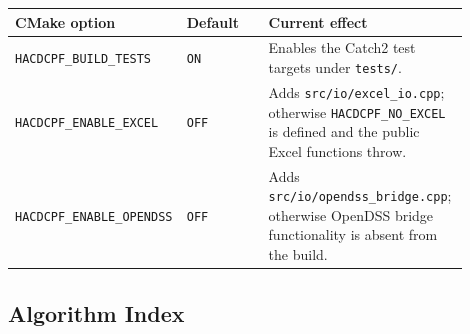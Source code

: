 \begin{longtable}{L{0.28\linewidth}L{0.18\linewidth}L{0.44\linewidth}}
\toprule
CMake option & Default & Current effect \\
\midrule
\endhead
\texttt{HACDCPF\_BUILD\_TESTS} & \texttt{ON} & Enables the Catch2 test targets under \texttt{tests/}. \\
\texttt{HACDCPF\_ENABLE\_EXCEL} & \texttt{OFF} & Adds \texttt{src/io/excel\_io.cpp}; otherwise \texttt{HACDCPF\_NO\_EXCEL} is defined and the public Excel functions throw. \\
\texttt{HACDCPF\_ENABLE\_OPENDSS} & \texttt{OFF} & Adds \texttt{src/io/opendss\_bridge.cpp}; otherwise OpenDSS bridge functionality is absent from the build. \\
\bottomrule
\end{longtable}

\subsection{Algorithm Index}
\label{sec:algorithms}

